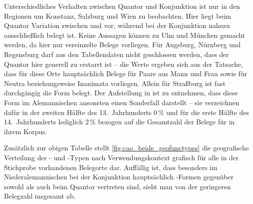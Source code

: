 Unterschiedliches Verhalten zwischen Quantor und Konjunktion ist nur in den
Regionen um Konstanz, Salzburg und Wien zu beobachten. Hier liegt beim Quantor
Variation zwischen  und  vor, während bei der
Konjunktion nahezu ausschließlich  belegt ist. Keine Aussagen
können zu Ulm und München gemacht werden, da hier nur vereinzelte Belege
vorliegen. Für Augsburg, Nürnberg und Regensburg darf aus den Tabellendaten
nicht geschlossen werden, dass der Quantor hier generell zu 
erstarrt ist -- die Werte ergeben sich aus der Tatsache, dass für diese Orte
hauptsächlich Belege für Paare aus Mann und Frau sowie für Neutra
beziehungsweise Inanimata vorliegen. Allein für Straßburg ist fast durchgängig
die Form  belegt. Der Aufstellung in \citet[621, Abb.~P~177]{ksw2}
ist zu entnehmen, dass diese Form im Alemannischen ansonsten einen Sonderfall
darstellt -- sie verzeichnen dafür in der zweiten Hälfte des 13.~Jahrhunderts
0\,\% und für die erste Hälfte des 14.~Jahrhunderts lediglich 2\,\% bezogen
auf die Gesamtzahl der Belege für  in ihrem Korpus.

Zusätzlich zur obigen Tabelle stellt \cref{fig:cao_beide_geofunctypes} die
geografische Verteilung der - und -Typen nach
Verwendungskontext grafisch für alle in der Stichprobe vorhandenen Belegorte
dar. Auffällig ist, dass besonders im Nieder\-alemannischen bei der Konjunktion
hauptsächlich -Formen gegenüber sowohl  als auch
 beim Quantor vertreten sind, sieht man von der geringeren
Belegzahl insgesamt ab.

